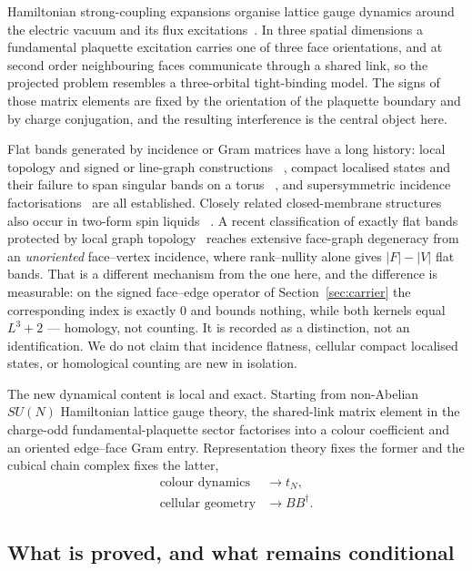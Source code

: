 \documentclass[11pt]{article}
\theoremstyle{plain}
\theoremstyle{definition}
\theoremstyle{remark}
\newcommand{\chk}[1]{}
\newcommand{\dg}{^{\dagger}}
\begin{document}
Hamiltonian strong-coupling expansions organise lattice gauge dynamics around
the electric vacuum and its flux excitations~\cite{KS1975,KSS1976}. In three
spatial dimensions a fundamental plaquette excitation carries one of three face
orientations, and at second order neighbouring faces communicate through a
shared link, so the projected problem resembles a three-orbital tight-binding
model. The signs of those matrix elements are fixed by the orientation of the
plaquette boundary and by charge conjugation, and the resulting interference is
the central object here.

Flat bands generated by incidence or Gram matrices have a long history: local
topology and signed or line-graph constructions
~\cite{Eckmann1944,Sutherland1986,Mielke1991,Zaslavsky2010,Kollar2020},
compact localised states and their failure to span singular bands on a torus
~\cite{Bergman2008,RhimYang2019}, and supersymmetric incidence
factorisations~\cite{Roychowdhury2024} are all established. Closely related
closed-membrane structures also occur in two-form spin liquids
~\cite{ChungGingras2025}. A recent
classification of exactly flat bands protected by local graph
topology~\cite{Hazra2026} reaches extensive face-graph degeneracy from an
\emph{unoriented} face--vertex incidence, where rank--nullity alone gives
$|F|-|V|$ flat bands. That is a different mechanism from the one here, and the
difference is measurable: on the signed face--edge operator of
Section~\ref{sec:carrier} the corresponding index is exactly $0$ and bounds
nothing, while both kernels equal $L^3+2$ --- homology, not counting. It is
recorded as a distinction, not an identification. We do not claim that
incidence flatness, cellular compact localised states, or homological counting
are new in isolation.
\chk{the discrete index theorem gives 0 on the signed face-edge operator, bounding nothing}

The new dynamical content is local and exact. Starting from non-Abelian
$SU(N)$ Hamiltonian lattice gauge theory, the shared-link matrix element in the
charge-odd fundamental-plaquette sector factorises into a colour coefficient
and an oriented edge--face Gram entry. Representation theory fixes the former
and the cubical chain complex fixes the latter,
\[
  \begin{aligned}
    \text{colour dynamics}&\longrightarrow t_N,\\
    \text{cellular geometry}&\longrightarrow BB\dg .
  \end{aligned}
\]

\subsection*{What is proved, and what remains conditional}
\end{document}
